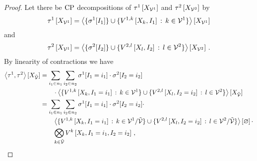 \begin{proof}
    Let there be $\mathrm{CP}$ decompositions of $\tau^{1}\left[X_{\mathcal{V}^{1}}\right]$ and $\tau^{2}\left[X_{\mathcal{V}^{2}}\right]$ by
    \begin{align*}
        \tau^{1}\left[X_{\mathcal{V}^{1}}\right]
        = \left\langle \{\sigma^{1}[I_{1}]\}\cup\{V^{1,k}\left[X_{k},I_{1}\right] \, : \, k\in\mathcal{V}^{1}\}\right\rangle \left[ X_{\mathcal{V}^{1}} \right]
    \end{align*}
    and
    \begin{align*}
        \tau^{2}\left[X_{\mathcal{V}^{1}}\right]
        = \left\langle \{\sigma^{2}[I_{2}]\}\cup\{V^{2,l}\left[X_{l},I_{2}\right] \, : \, l\in\mathcal{V}^{2}\}\right\rangle \left[ X_{\mathcal{V}^{2}} \right] \, .
    \end{align*}
    By linearity of contractions we have
    \begin{align*}
        \contractionof{\hypercoreof{1},\hypercoreof{2}}{\catvariableof{\secnodes}}
        &= \sum_{\decindexof{1}\in\decdimof{1}} \sum_{\decindexof{2}\in\decdimof{2}}
        \scalarcoreofat{1}{\indexeddecvariableof{1}} \cdot \scalarcoreofat{2}{\indexeddecvariableof{2}} \\
        & \quad\quad \cdot \contractionof{\{\legcoreofat{1,\atomenumerator}{\catvariableof{\atomenumerator},\indexeddecvariableof{1}} \, : \, \atomenumerator\in\nodesone\} \cup \{\legcoreofat{2,\secatomenumerator}{\catvariableof{\secatomenumerator},\indexeddecvariableof{2}} \, : \, \secatomenumerator\in\nodestwo\}}{\catvariableof{\secnodes}} \\
        &= \sum_{\decindexof{1}\in\decdimof{1}} \sum_{\decindexof{2}\in\decdimof{2}}
        \scalarcoreofat{1}{\indexeddecvariableof{1}} \cdot \scalarcoreofat{2}{\indexeddecvariableof{2}} \cdot \\
        & \quad\quad \contraction{\{\legcoreofat{1,\atomenumerator}{\catvariableof{\atomenumerator},\indexeddecvariableof{1}} \, : \, \atomenumerator\in\nodesone/\secnodes\} \cup \{\legcoreofat{2,\secatomenumerator}{\catvariableof{\secatomenumerator},\indexeddecvariableof{2}} \, : \, \secatomenumerator\in\nodestwo/\secnodes\}} \cdot \\
        & \quad\quad \bigotimes_{\atomenumerator\in\secnodes} \legcoreofat{\atomenumerator}{\catvariableof{\atomenumerator},\indexeddecvariableof{1},\indexeddecvariableof{2}} \, ,

\end{align*}
\end{proof}

